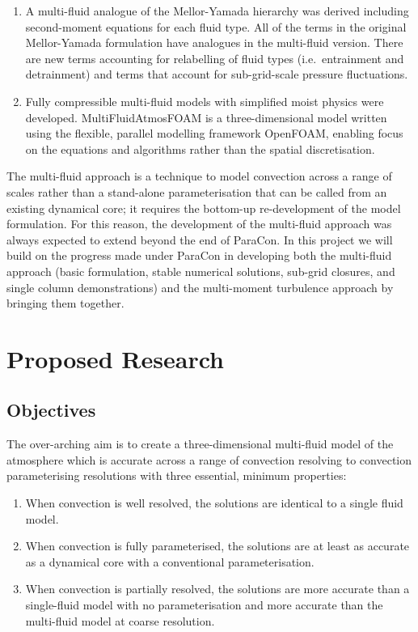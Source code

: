 \documentclass[11pt,a4paper]{article}
\begin{document}
\begin{enumerate}
\item A multi-fluid analogue of the Mellor-Yamada hierarchy was derived including second-moment equations for each fluid type. All of the terms in the original Mellor-Yamada formulation have analogues in the multi-fluid version. There are new terms accounting for relabelling of fluid types (i.e.\ entrainment and detrainment) and  terms that account for sub-grid-scale pressure fluctuations.

\item Fully compressible multi-fluid models with simplified moist physics were developed. MultiFluidAtmosFOAM is a three-dimensional model written using the flexible, parallel modelling framework OpenFOAM, enabling focus on the equations and algorithms rather than the spatial discretisation.

\end{enumerate}

The multi-fluid approach is a technique to model convection across a range of scales rather than a stand-alone parameterisation that can be called from an existing dynamical core; it requires the bottom-up re-development of the model formulation. For this reason, the development of the multi-fluid approach was always expected to extend beyond the end of ParaCon. In this project we will build on the progress made under ParaCon in developing both the multi-fluid approach (basic formulation, stable numerical solutions, sub-grid closures, and single column demonstrations) and the multi-moment turbulence approach by bringing them together.

\section{Proposed Research}

\subsection{Objectives}

The over-arching aim is to create a three-dimensional multi-fluid model of the atmosphere which is accurate across a range of convection resolving to convection parameterising resolutions with three essential, minimum properties:

\begin{enumerate}\renewcommand{\theenumi}{\alph{enumi}}
\item When convection is well resolved, the solutions are identical to a single fluid model.
\item When convection is fully parameterised, the solutions are at least as accurate as a dynamical core with a conventional parameterisation.
\item When convection is partially resolved, the solutions are more accurate than a single-fluid model with no parameterisation and more accurate than the multi-fluid model at coarse resolution.
\end{enumerate}
\end{document}
